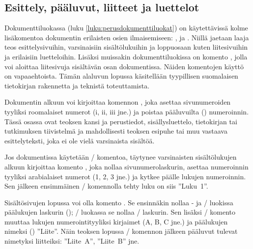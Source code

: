 \begin{koodilohkosis}
  \newcommand{\sectionbreak}{\clearpage}
\end{koodilohkosis}

\subsection{Esittely, pääluvut, liitteet ja luettelot}
\label{luku:frontmainbackmatter}

Dokumenttiluokassa  (luku \ref{luku:perusdokumenttiluokat})
on käytettävissä kolme lisäkomentoa dokumentin erilaisten osien
ilmaisemiseen: ,  ja
. Niillä jaetaan laaja teos esittelysivuihin,
varsinaisiin sisältölukuihin ja loppuosaan kuten liitesivuihin ja
erilaisiin luetteloihin. Lisäksi muissakin dokumenttiluokissa on komento
, jolla voi aloittaa liitesivuja sisältävän osan
dokumentissa. Näiden komentojen käyttö on vapaaehtoista. Tämän alaluvun
lopussa käsitellään tyypillisen suomalaisen tietokirjan rakennetta ja
teknistä toteuttamista.

Dokumentin alkuun voi kirjoittaa komennon , joka
asettaa sivunumeroiden tyyliksi roomalaiset numerot (i, ii, iii jne.) ja
poistaa pääluvuilta () numeroinnin. Tässä osassa ovat
teoksen kansi ja perustiedot, sisällysluettelo, tietokirjan tai
tutkimuksen tiivistelmä ja mahdollisesti teoksen esipuhe tai muu
vastaava esittelyteksti, joka ei ole vielä varsinaista sisältöä.

Jos dokumentissa käytetään \-/ komentoa, täytynee
varsinaisten sisältölukujen alkuun kirjoittaa komento
, joka nollaa sivunumerolaskurin, asettaa
numeroinnin tyyliksi arabialaiset numerot (1, 2, 3 jne.) ja kytkee
päälle lukujen numeroinnin. Sen jälkeen ensimmäinen \-/
komennolla tehty luku on siis ''Luku~1''.

Sisältösivujen lopussa voi olla komento . Se
ensinnäkin nollaa - ja \-/ luokissa
päälukujen laskurin (); \-/ luokassa se
nollaa \-/ laskurin. Sen lisäksi \-/
komento muuttaa lukujen numerointityyliksi kirjaimet (A, B, C jne.) ja
päälukujen nimeksi () ''Liite''. Näin teoksen
lopussa \-/ komennon jälkeen pääluvut tulevat
nimetyksi liitteiksi: ''Liite~A'', ''Liite~B'' jne.

